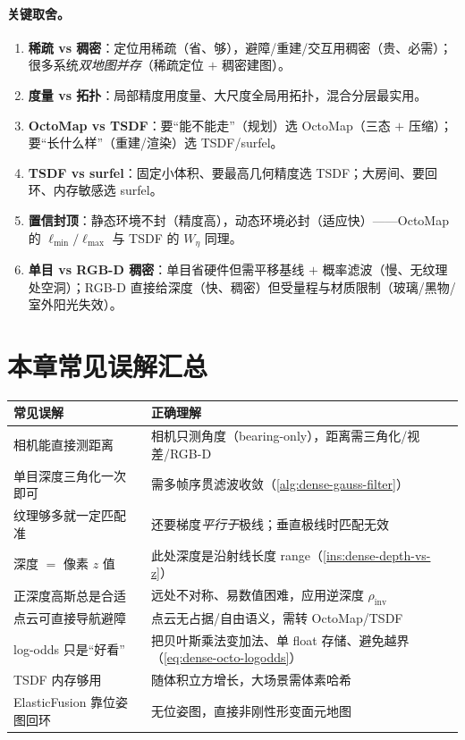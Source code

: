 \paragraph{关键取舍。}
\begin{enumerate}
  \item \textbf{稀疏 vs 稠密}：定位用稀疏（省、够），避障/重建/交互用稠密（贵、必需）；很多系统\emph{双地图并存}（稀疏定位 $+$ 稠密建图）。
  \item \textbf{度量 vs 拓扑}：局部精度用度量、大尺度全局用拓扑，混合分层最实用。
  \item \textbf{OctoMap vs TSDF}：要“能不能走”（规划）选 OctoMap（三态 $+$ 压缩）；要“长什么样”（重建/渲染）选 TSDF/surfel。
  \item \textbf{TSDF vs surfel}：固定小体积、要最高几何精度选 TSDF；大房间、要回环、内存敏感选 surfel。
  \item \textbf{置信封顶}：静态环境不封（精度高），动态环境必封（适应快）——OctoMap 的 $\ell_{\min}/\ell_{\max}$ 与 TSDF 的 $W_\eta$ 同理。
  \item \textbf{单目 vs RGB-D 稠密}：单目省硬件但需平移基线 $+$ 概率滤波（慢、无纹理处空洞）；RGB-D 直接给深度（快、稠密）但受量程与材质限制（玻璃/黑物/室外阳光失效）。
\end{enumerate}

\section*{本章常见误解汇总}
\begin{table}[H]\centering\small
\begin{tabular}{p{} p{}}
\toprule
\textbf{常见误解} & \textbf{正确理解} \\
\midrule
相机能直接测距离 & 相机只测角度（bearing-only），距离需三角化/视差/RGB-D \\
单目深度三角化一次即可 & 需多帧序贯滤波收敛（\cref{alg:dense-gauss-filter}）\\
纹理够多就一定匹配准 & 还要梯度\emph{平行于}极线；垂直极线时匹配无效 \\
深度 $=$ 像素 $z$ 值 & 此处深度是沿射线长度 range（\cref{ins:dense-depth-vs-z}）\\
正深度高斯总是合适 & 远处不对称、易数值困难，应用逆深度 $\rho_{\mathrm{inv}}$ \\
点云可直接导航避障 & 点云无占据/自由语义，需转 OctoMap/TSDF \\
log-odds 只是“好看” & 把贝叶斯乘法变加法、单 float 存储、避免越界（\cref{eq:dense-octo-logodds}）\\
TSDF 内存够用 & 随体积立方增长，大场景需体素哈希 \\
ElasticFusion 靠位姿图回环 & 无位姿图，直接非刚性形变面元地图 \\
\bottomrule
\end{tabular}
\end{table}


